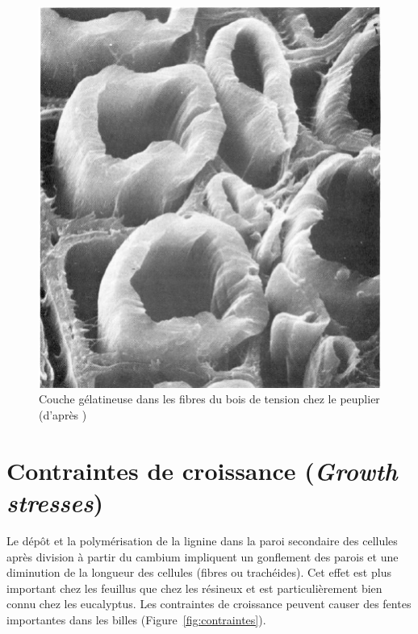 \begin{figure}[h]
	\centering
	\includegraphics[scale=0.55]{img/ch9_tension_micro}
	\caption{Couche gélatineuse dans les fibres du bois de tension chez le peuplier (d'après \cite{panshin1980textbook})}
	\label{fig:tension_micro}
\end{figure}

\section{Contraintes de croissance (\textit{Growth stresses})}

Le dépôt et la polymérisation de la lignine dans la paroi secondaire des cellules après division à partir du cambium impliquent un gonflement des parois et une diminution de la longueur des cellules (fibres ou trachéides). Cet effet est plus important chez les feuillus que chez les résineux et est particulièrement bien connu chez les eucalyptus. Les contraintes de croissance peuvent causer des fentes importantes dans les billes (Figure~\ref{fig:contraintes}).

